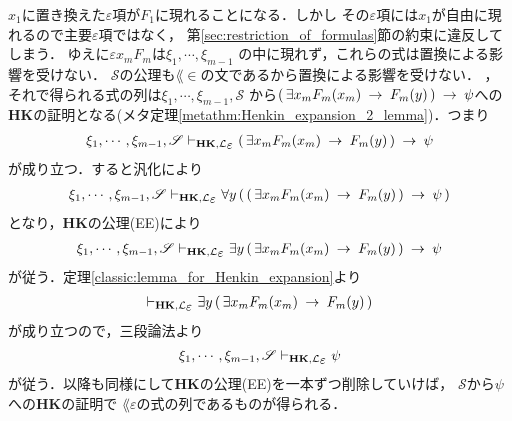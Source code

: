 \begin{sketch}
{			$x_{1}$に置き換えた$\varepsilon$項が$F_{1}$に現れることになる．しかし
			その$\varepsilon$項には$x_{1}$が自由に現れるので主要$\varepsilon$項ではなく，
			第\ref{sec:restriction_of_formulas}節の約束に違反してしまう．
			ゆえに$\varepsilon x_{m} F_{m}$は$\xi_{1},\cdots,\xi_{m-1}$
			の中に現れず，これらの式は置換による影響を受けない．
			$\mathscr{S}$の公理も$\lang{\in}$の文であるから置換による影響を受けない．
		}，それで得られる式の列は$\xi_{1},\cdots,\xi_{m-1},\mathscr{S}$
		から$(\, \exists x_{m} F_{m}(x_{m}) \hspace{0.25em}\rightarrow\hspace{0.25em} F_{m}(y)\, ) \hspace{0.25em}\rightarrow\hspace{0.25em} \psi$への
		{\bf HK}の証明となる(メタ定理\ref{metathm:Henkin_expansion_2_lemma})．つまり
		\begin{align}
			\xi_{1},\cdots,\xi_{m-1},\mathscr{S} 
			\provable{\mbox{{\bf HK}},\lang{\varepsilon}} 
			(\, \exists x_{m} F_{m}(x_{m}) \rarrow F_{m}(y)\, ) \rarrow \psi
		\end{align}
		が成り立つ．すると汎化により
		\begin{align}
			\xi_{1},\cdots,\xi_{m-1},\mathscr{S} 
			\provable{\mbox{{\bf HK}},\lang{\varepsilon}}
			\forall y\, (\, (\, \exists x_{m} F_{m}(x_{m}) \rarrow F_{m}(y)\, ) \rarrow \psi\, )
		\end{align}
		となり，{\bf HK}の公理(EE)により
		\begin{align}
			\xi_{1},\cdots,\xi_{m-1},\mathscr{S} 
			\provable{\mbox{{\bf HK}},\lang{\varepsilon}}
			\exists y\, (\, \exists x_{m} F_{m}(x_{m}) \rarrow F_{m}(y)\, ) \rarrow \psi
		\end{align}
		が従う．定理\ref{classic:lemma_for_Henkin_expansion}より
		\begin{align}
			\provable{\mbox{{\bf HK}},\lang{\varepsilon}}
			\exists y\, (\, \exists x_{m} F_{m}(x_{m}) \rarrow F_{m}(y)\, )
		\end{align}
		が成り立つので，三段論法より
		\begin{align}
			\xi_{1},\cdots,\xi_{m-1},\mathscr{S} 
			\provable{\mbox{{\bf HK}},\lang{\varepsilon}} \psi
		\end{align}
		が従う．以降も同様にして{\bf HK}の公理(EE)を一本ずつ削除していけば，
		$\mathscr{S}$から$\psi$への{\bf HK}の証明で
		$\lang{\varepsilon}$の式の列であるものが得られる．
		\QED
	\end{sketch}
	
